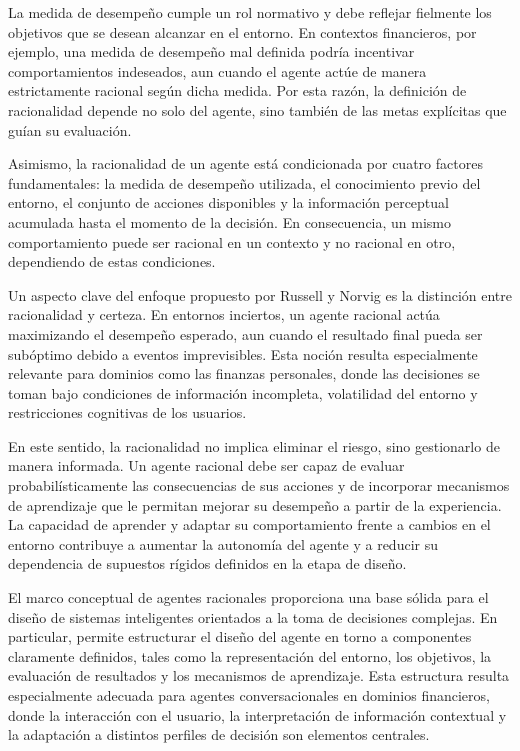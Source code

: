 \documentclass[
	spanish, %
	letterpaper, oneside
]{book}
\begin{document}
La medida de desempeño cumple un rol normativo y debe reflejar fielmente los objetivos que se desean alcanzar en el entorno. En contextos financieros, por ejemplo, una medida de desempeño mal definida podría incentivar comportamientos indeseados, aun cuando el agente actúe de manera estrictamente racional según dicha medida. Por esta razón, la definición de racionalidad depende no solo del agente, sino también de las metas explícitas que guían su evaluación.

Asimismo, la racionalidad de un agente está condicionada por cuatro factores fundamentales: la medida de desempeño utilizada, el conocimiento previo del entorno, el conjunto de acciones disponibles y la información perceptual acumulada hasta el momento de la decisión. En consecuencia, un mismo comportamiento puede ser racional en un contexto y no racional en otro, dependiendo de estas condiciones.


Un aspecto clave del enfoque propuesto por Russell y Norvig es la distinción entre racionalidad y certeza. En entornos inciertos, un agente racional actúa maximizando el desempeño esperado, aun cuando el resultado final pueda ser subóptimo debido a eventos imprevisibles. Esta noción resulta especialmente relevante para dominios como las finanzas personales, donde las decisiones se toman bajo condiciones de información incompleta, volatilidad del entorno y restricciones cognitivas de los usuarios.

En este sentido, la racionalidad no implica eliminar el riesgo, sino gestionarlo de manera informada. Un agente racional debe ser capaz de evaluar probabilísticamente las consecuencias de sus acciones y de incorporar mecanismos de aprendizaje que le permitan mejorar su desempeño a partir de la experiencia. La capacidad de aprender y adaptar su comportamiento frente a cambios en el entorno contribuye a aumentar la autonomía del agente y a reducir su dependencia de supuestos rígidos definidos en la etapa de diseño.


El marco conceptual de agentes racionales proporciona una base sólida para el diseño de sistemas inteligentes orientados a la toma de decisiones complejas. En particular, permite estructurar el diseño del agente en torno a componentes claramente definidos, tales como la representación del entorno, los objetivos, la evaluación de resultados y los mecanismos de aprendizaje. Esta estructura resulta especialmente adecuada para agentes conversacionales en dominios financieros, donde la interacción con el usuario, la interpretación de información contextual y la adaptación a distintos perfiles de decisión son elementos centrales.
\end{document}
